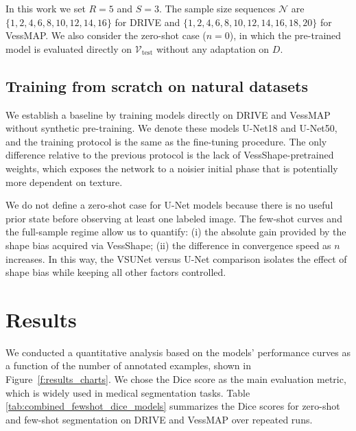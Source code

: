 \documentclass[%
reprint,
nofootinbib,
 amsmath,amssymb,
aps,
superscriptaddress,
showkeys,
longbibliography
]{revtex4-1}
\begin{document}
In this work we set $R=5$ and $S=3$. The sample size sequences $\mathcal{N}$ are $\{1,2,4,6,8,10, 12, 14, 16\}$ for DRIVE and $\{1,2,4,6,8,10, 12, 14, 16,18,20\}$ for VessMAP. We also consider the zero-shot case ($n=0$), in which the pre-trained model is evaluated directly on $\mathcal{V}_{\text{test}}$ without any adaptation on $D$. 


\subsection{Training from scratch on natural datasets}

We establish a baseline by training models directly on DRIVE and VessMAP without synthetic pre-training. We denote these models U-Net18 and U-Net50, and the training protocol is the same as the fine-tuning procedure. The only difference relative to the previous protocol is the lack of VessShape-pretrained weights, which exposes the network to a noisier initial phase that is potentially more dependent on texture.

We do not define a zero-shot case for U-Net models because there is no useful prior state before observing at least one labeled image. The few-shot curves and the full-sample regime allow us to quantify: (i) the absolute gain provided by the shape bias acquired via VessShape; (ii) the difference in convergence speed as $n$ increases. In this way, the VSUNet versus U-Net comparison isolates the effect of shape bias while keeping all other factors controlled.


\section{Results}
\label{s:results}

We conducted a quantitative analysis based on the models' performance curves as a function of the number of annotated examples, shown in Figure~\ref{f:results_charts}. We chose the Dice score as the main evaluation metric, which is widely used in medical segmentation tasks. Table \ref{tab:combined_fewshot_dice_models} summarizes the Dice scores for zero-shot and few-shot segmentation on DRIVE and VessMAP over repeated runs.
\end{document}
